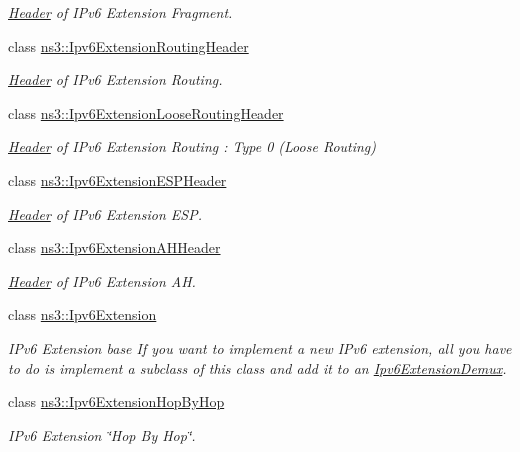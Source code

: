 \begin{DoxyCompactItemize}
\begin{DoxyCompactList}\small\item\em \hyperlink{classns3_1_1Header}{Header} of I\+Pv6 Extension Fragment. \end{DoxyCompactList}\item 
class \hyperlink{classns3_1_1Ipv6ExtensionRoutingHeader}{ns3\+::\+Ipv6\+Extension\+Routing\+Header}
\begin{DoxyCompactList}\small\item\em \hyperlink{classns3_1_1Header}{Header} of I\+Pv6 Extension Routing. \end{DoxyCompactList}\item 
class \hyperlink{classns3_1_1Ipv6ExtensionLooseRoutingHeader}{ns3\+::\+Ipv6\+Extension\+Loose\+Routing\+Header}
\begin{DoxyCompactList}\small\item\em \hyperlink{classns3_1_1Header}{Header} of I\+Pv6 Extension Routing \+: Type 0 (Loose Routing) \end{DoxyCompactList}\item 
class \hyperlink{classns3_1_1Ipv6ExtensionESPHeader}{ns3\+::\+Ipv6\+Extension\+E\+S\+P\+Header}
\begin{DoxyCompactList}\small\item\em \hyperlink{classns3_1_1Header}{Header} of I\+Pv6 Extension E\+SP. \end{DoxyCompactList}\item 
class \hyperlink{classns3_1_1Ipv6ExtensionAHHeader}{ns3\+::\+Ipv6\+Extension\+A\+H\+Header}
\begin{DoxyCompactList}\small\item\em \hyperlink{classns3_1_1Header}{Header} of I\+Pv6 Extension AH. \end{DoxyCompactList}\item 
class \hyperlink{classns3_1_1Ipv6Extension}{ns3\+::\+Ipv6\+Extension}
\begin{DoxyCompactList}\small\item\em I\+Pv6 Extension base If you want to implement a new I\+Pv6 extension, all you have to do is implement a subclass of this class and add it to an \hyperlink{classns3_1_1Ipv6ExtensionDemux}{Ipv6\+Extension\+Demux}. \end{DoxyCompactList}\item 
class \hyperlink{classns3_1_1Ipv6ExtensionHopByHop}{ns3\+::\+Ipv6\+Extension\+Hop\+By\+Hop}
\begin{DoxyCompactList}\small\item\em I\+Pv6 Extension \char`\"{}\+Hop By Hop\char`\"{}. \end{DoxyCompactList}\item 

\end{DoxyCompactItemize}
